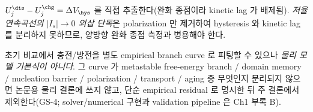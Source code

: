 $U_j^\dis-U_j^\chg=\Delta V_\hys$ 를 직접 추출한다(완화 종점이라 kinetic lag 가 배제됨). \emph{저율 연속곡선의
$|I_s|\to0$ 외삽 단독}은 polarization 만 제거하여 hysteresis 와 kinetic lag 를 분리하지 못하므로, 양방향 완화
종점 측정과 병용해야 한다.
\begin{practicebox}
초기 비교에서 충전/방전을 별도 empirical branch curve 로 피팅할 수 있으나 \emph{물리 모델 기본식이 아니다}.
그 curve 가 metastable free-energy branch / domain memory / nucleation barrier / polarization / transport /
aging 중 무엇인지 분리되지 않으면 논문용 물리 결론에 쓰지 않고, 단순 empirical residual 로 명시한 뒤 주 결론에서
제외한다(GS-4; solver/numerical 구현과 validation pipeline 은 Ch1 부록 B).
\end{practicebox}

